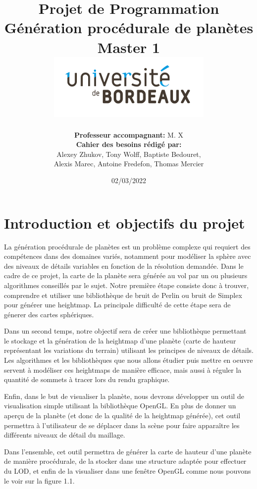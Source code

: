 \documentclass[12pt]{report}
\title{
{\LARGE \textbf{ Projet de Programmation \\ Génération procédurale de planètes }}\\
 {\large Master 1 }\\
 {\vspace{10mm}}
 {\includegraphics[width=0.6\textwidth]{images/télécharger.png}}
 }
\author{\textbf{Professeur accompagnant:} M. X\\\textbf{Cahier des besoins rédigé par:} \\Alexey Zhukov, Tony Wolff, Baptiste Bedouret, \\Alexis Marec, Antoine Fredefon, Thomas Mercier}
\date{02/03/2022}
\begin{document}
\maketitle
\clearpage

\tableofcontents
{}
\newpage

\chapter{Introduction et objectifs du projet}


La génération procédurale de planètes est un problème complexe qui requiert des compétences dans des domaines variés, notamment pour modéliser la sphère avec des niveaux de détails variables en fonction de la résolution demandée. Dans le cadre de ce projet, la carte de la planète sera générée au vol par un ou plusieurs algorithmes conseillés par le sujet. Notre première étape consiste donc à trouver, comprendre et utiliser une bibliothèque de bruit de Perlin ou bruit de Simplex pour générer une heightmap. La principale difficulté de cette étape sera de génerer des cartes sphériques.

Dans un second temps, notre objectif sera de créer une bibliothèque permettant le stockage et la génération de la heightmap d'une planète (carte de hauteur représentant les variations du terrain) utilisant les principes de niveaux de détails. Les algorithmes et les bibliothèques que nous allons étudier puis mettre en oeuvre servent à modéliser ces heightmaps de manière efficace, mais aussi à réguler la quantité de sommets à tracer lors du rendu graphique.

Enfin, dans le but de visualiser la planète, nous devrons développer un outil de visualisation simple utilisant la bibliothèque OpenGL. En plus de donner un aperçu de la planète (et donc de la qualité de la heightmap générée), cet outil permettra à l'utilisateur de se déplacer dans la scène pour faire apparaître les différents niveaux de détail du maillage.

Dans l'ensemble, cet outil permettra de générer la carte de hauteur d'une planète de manière procédurale, de la stocker dans une structure adaptée pour effectuer du LOD, et enfin de la visualiser dans une fenêtre OpenGL comme nous pouvons le voir sur la figure 1.1.
\end{document}
